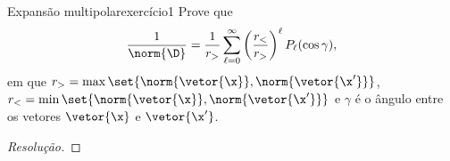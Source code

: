 \begin{exercício}{Expansão multipolar}{exercício1}
    Prove que
    \begin{equation*}
        \frac{1}{\norm{\D}} = \frac{1}{r_>} \sum_{\ell = 0}^\infty \left(\frac{r_<}{r_>}\right)^\ell P_\ell(\cos \gamma),
    \end{equation*}
    em que \(r_> = \max\set{\norm{\vetor{\x}}, \norm{\vetor{\x'}}}\), \(r_< = \min\set{\norm{\vetor{\x}}, \norm{\vetor{\x'}}}\) e \(\gamma\) é o ângulo entre os vetores \(\vetor{\x}\) e \(\vetor{\x'}\).
\end{exercício}
\begin{proof}[Resolução]

\end{proof}

